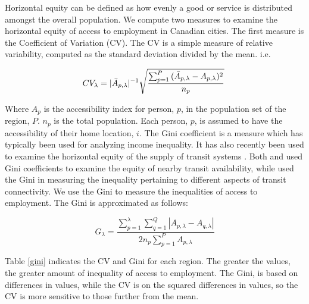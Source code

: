 \documentclass[11 pt, letterpaper]{article}
\begin{document}
{Horizontal equity can be defined as how evenly a good or service is distributed amongst the overall population. We compute two measures to examine the horizontal equity of access to employment in Canadian cities. The first measure is the Coefficient of Variation (CV). The CV is a simple measure of relative variability, computed as the standard deviation divided by the mean. i.e.

\begin{equation}
CV_\lambda = |{\bar{A}_{p,\lambda}}|^{-1}\sqrt{\frac{\sum_{p=1}^{P}{(\bar{A}_{p,\lambda} - {A}_{p,\lambda}})^2}{n_p}} \hspace{1mm}
\end{equation}

Where $A_p$ is the accessibility index for person, $p$, in the population set of the region, $P$. $n_p$ is the total population. Each person, $p$, is assumed to have the accessibility of their home location, $i$. The Gini coefficient is a measure which has typically been used for analyzing income inequality. It has also recently been used to examine the horizontal equity of the supply of transit systems \cite{delbosc2011c,bertolaccini2013,welch2013}. Both  and  used Gini coefficients to examine the equity of nearby transit availability, while  used the Gini in measuring the inequality pertaining to different aspects of transit connectivity. We use the Gini to measure the inequalities of access to employment. The Gini is approximated as follows:

\begin{equation}
G_\lambda = \frac{\sum_{p=1}^{\lambda} \sum_{q=1}^{Q} | {A}_{p,\lambda} - A_{q,\lambda} |}{2 n_p \sum_{p=1}^{P} {A}_{p,\lambda}}
\end{equation}

Table \ref{gini} indicates the CV and Gini for each region. The greater the values, the greater amount of inequality of access to employment. The Gini, is based on differences in values, while the CV is on the squared differences in values, so the CV is more sensitive to those further from the mean. %

}
\end{document}
